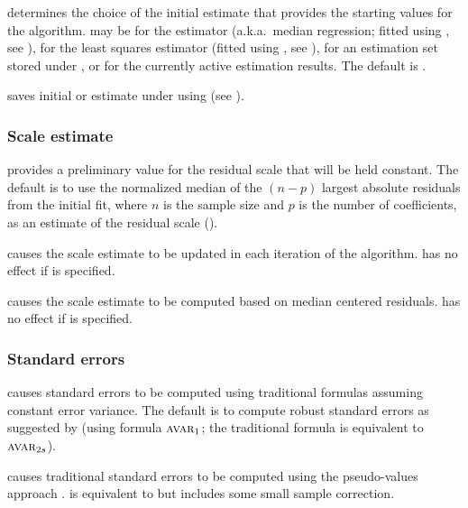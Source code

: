 \hangpara
     determines the choice of the initial estimate
    that provides the starting values for the  algorithm.
     may be  for the  estimator (a.k.a.\ median
    regression; fitted using , see ),  for
    the least squares estimator (fitted using , see
    ),  for an estimation set stored under
    , or  for the currently active estimation results. The
    default is .

\hangpara
     saves initial  or  estimate
    under  using  (see ).

\subsubsection{Scale estimate}

\hangpara
     provides a preliminary value for the residual scale
    that will be held constant. The default is to use the normalized median of
    the $(n-p)$ largest absolute residuals from the initial fit, where $n$ is
    the sample size and $p$ is the number of coefficients, as an estimate of
    the residual scale ().

\hangpara
     causes the  scale estimate to be updated in
    each iteration of the  algorithm.  has no
    effect if  is specified.

\hangpara
     causes the  scale estimate to be computed based
    on median centered residuals.  has no effect if
     is specified.

\subsubsection{Standard errors}

\hangpara
     causes standard errors to be computed
    using traditional formulas assuming constant error variance. The default
    is to compute robust standard errors as suggested by \citet{Croux:2003}
    (using formula $\stsc{Avar}_1$; the traditional formula is equivalent to
    $\stsc{Avar}_{2s}$).

\hangpara
     causes traditional standard errors to be computed using the
    pseudo-values approach \citep{street.etal.AmStat.1988}.  is
    equivalent to  but includes some small sample
    correction.

